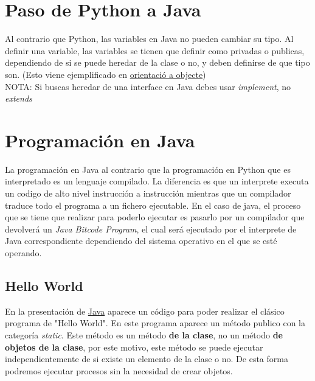 \documentclass[11pt]{article}
\theoremstyle{plain}
\begin{document}
    \section{Paso de Python a Java} %
    \label{sec:paso_de_python_a_java}
        Al contrario que Python, las variables en Java no pueden cambiar su tipo. Al definir una variable, las variables se tienen que definir como privadas o publicas, dependiendo de si se puede heredar de la clase o no, y deben definirse de que tipo son. (Esto viene ejemplificado en \href{https://e-aules.uab.cat/2022-23/pluginfile.php/644137/course/section/76903/object_orientation.pdf?time=1675980795699}{orientació a objecte})\\

        NOTA: Si buscas heredar de una interface en Java debes usar \textit{implement}, no \textit{extends}
    \section{Programación en Java} %
    \label{sec:programación_en_java}
        La programación en Java al contrario que la programación en Python que es interpretado es un lenguaje compilado. La diferencia es que un interprete executa un codigo de alto nivel instrucción a instrucción mientras que un compilador traduce todo el programa a un fichero ejecutable. En el caso de java, el proceso que se tiene que realizar para poderlo ejecutar es pasarlo por un compilador que devolverá un \textit{Java Bitcode Program}, el cual será ejecutado por el interprete de Java correspondiente dependiendo del sistema operativo en el que se esté operando.\\

        \subsection{Hello World} %
        \label{sub:hello_world}
            En la presentación de \href{https://e-aules.uab.cat/2022-23/pluginfile.php/644137/course/section/76903/java.pdf?time=1675980815252}{Java} aparece un código para poder realizar el clásico programa de "Hello World". En este programa aparece un método publico con la categoría \textit{static}. Este método es un método \textbf{de la clase}, no un método \textbf{de objetos de la clase}, por este motivo, este método se puede ejecutar independientemente de si existe un elemento de la clase o no. De esta forma podremos ejecutar procesos sin la necesidad de crear objetos.
\end{document}

